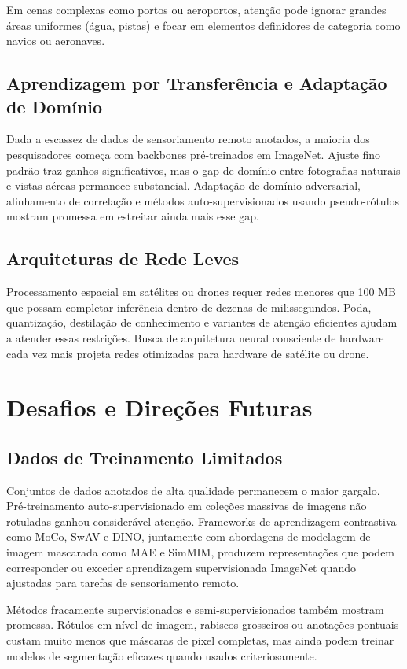 \documentclass[12pt,a4paper]{article}
\begin{document}
Em cenas complexas como portos ou aeroportos, atenção pode ignorar grandes áreas uniformes (água, pistas) e focar em elementos definidores de categoria como navios ou aeronaves.

\subsection{Aprendizagem por Transferência e Adaptação de Domínio}
Dada a escassez de dados de sensoriamento remoto anotados, a maioria dos pesquisadores começa com backbones pré-treinados em ImageNet. Ajuste fino padrão traz ganhos significativos, mas o gap de domínio entre fotografias naturais e vistas aéreas permanece substancial. Adaptação de domínio adversarial, alinhamento de correlação e métodos auto-supervisionados usando pseudo-rótulos mostram promessa em estreitar ainda mais esse gap.

\subsection{Arquiteturas de Rede Leves}
Processamento espacial em satélites ou drones requer redes menores que 100 MB que possam completar inferência dentro de dezenas de milissegundos. Poda, quantização, destilação de conhecimento e variantes de atenção eficientes ajudam a atender essas restrições. Busca de arquitetura neural consciente de hardware cada vez mais projeta redes otimizadas para hardware de satélite ou drone.

\section{Desafios e Direções Futuras}
\label{sec:challenges}
\subsection{Dados de Treinamento Limitados}
Conjuntos de dados anotados de alta qualidade permanecem o maior gargalo. Pré-treinamento auto-supervisionado em coleções massivas de imagens não rotuladas ganhou considerável atenção. Frameworks de aprendizagem contrastiva como MoCo, SwAV e DINO, juntamente com abordagens de modelagem de imagem mascarada como MAE e SimMIM, produzem representações que podem corresponder ou exceder aprendizagem supervisionada ImageNet quando ajustadas para tarefas de sensoriamento remoto.

Métodos fracamente supervisionados e semi-supervisionados também mostram promessa. Rótulos em nível de imagem, rabiscos grosseiros ou anotações pontuais custam muito menos que máscaras de pixel completas, mas ainda podem treinar modelos de segmentação eficazes quando usados criteriosamente.
\end{document}
